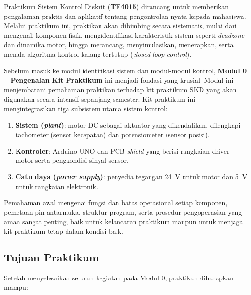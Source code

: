 \documentclass[11pt,a4paper]{article}
\begin{document}
Praktikum Sistem Kontrol Diskrit (\textbf{TF4015}) dirancang untuk memberikan pengalaman praktis dan aplikatif tentang pengontrolan nyata kepada mahasiswa. Melalui praktikum ini, praktikan akan dibimbing secara sistematis, mulai dari mengenali komponen fisik, mengidentifikasi karakteristik sistem seperti \textit{deadzone} dan dinamika motor, hingga merancang, menyimulasikan, menerapkan, serta menala algoritma kontrol kalang tertutup (\textit{closed-loop control}).

Sebelum masuk ke modul identifikasi sistem dan modul-modul kontrol, \textbf{Modul 0 -- Pengenalan Kit Praktikum} ini menjadi fondasi yang krusial. Modul ini menjembatani pemahaman praktikan terhadap kit praktikum SKD yang akan digunakan secara intensif sepanjang semester. Kit praktikum ini mengintegrasikan tiga subsistem utama sistem kontrol:

\begin{enumerate}
	\item \textbf{Sistem (\textit{plant})}: motor DC sebagai aktuator yang dikendalikan, dilengkapi tachometer (sensor kecepatan) dan potensiometer (sensor posisi).
	\item \textbf{Kontroler}: Arduino UNO dan PCB \textit{shield} yang berisi rangkaian driver motor serta pengkondisi sinyal sensor.
	\item \textbf{Catu daya (\textit{power supply})}: penyedia tegangan 24~V untuk motor dan 5~V untuk rangkaian elektronik.
\end{enumerate}

Pemahaman awal mengenai fungsi dan batas operasional setiap komponen, pemetaan pin antarmuka, struktur program, serta prosedur pengoperasian yang aman sangat penting, baik untuk kelancaran praktikum maupun untuk menjaga kit praktikum tetap dalam kondisi baik.

\subsection{Tujuan Praktikum}
Setelah menyelesaikan seluruh kegiatan pada Modul 0, praktikan diharapkan mampu:
\end{document}
